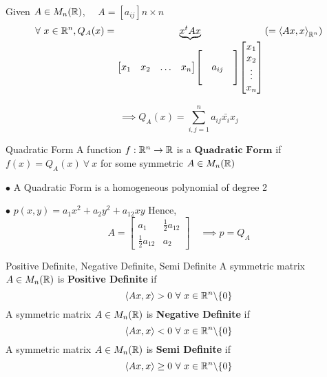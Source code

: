 \documentclass[../Analysis-3]{subfiles}
\begin{document}
\begin{notnBox}
    Given $A \in M_n(\mathbb{R})$, $ \quad A = \left[a_{ij}\right] n \times n $
    \[ \forall\ x \in \mathbb{R}^n, Q_A(x) = \underbrace{x^tAx}_{\begin{bmatrix}
                x_1 & x_2 & \ldots & x_n
            \end{bmatrix} \begin{bmatrix}
                 &        & \\
                 & a_{ij} & \\
                 &        &
            \end{bmatrix} \begin{bmatrix}
                x_1    \\
                x_2    \\
                \vdots \\
                x_n
            \end{bmatrix}} \left( = {\left\langle Ax, x \right\rangle}_{\mathbb{R}^n} \right) \]

    \[ \implies Q_A(x) = \sum_{i,j = 1}^{n} a_{ij} \bar{x_i} x_j  \]
\end{notnBox}


\begin{Def}{Quadratic Form}{}
    A function $f : \mathbb{R}^n \to \mathbb{R}$ is a $\textbf{Quadratic Form}$ if $f(x) = Q_A(x) \ \forall\ x $ for some symmetric $A \in M_n(\mathbb{R})$
\end{Def}

$\bullet$ A Quadratic Form is a homogeneous polynomial of degree 2

\vspace{3mm}

$\bullet$ $p(x,y) = a_1 x^2 + a_2 y^2 + a_{12} xy$
Hence, \[ A = \begin{bmatrix}
        a_1                & \frac{1}{2} a_{12} \\
        \frac{1}{2} a_{12} & a_2
    \end{bmatrix} \quad \implies p = Q_A \]

\begin{Def}{Positive Definite, Negative Definite, Semi Definite}{}
    A symmetric matrix $A \in M_n(\mathbb{R})$ is \textbf{Positive Definite} if \[ \left\langle Ax, x \right\rangle > 0 \ \forall\ x \in \R^n \backslash \{0\} \]
    \vspace{2mm}
    A symmetric matrix $A \in M_n(\mathbb{R})$ is \textbf{Negative Definite} if \[ \left\langle Ax, x \right\rangle < 0 \ \forall\ x \in \mathbb{R}^n \backslash \{0\} \]
    A symmetric matrix $A \in M_n(\mathbb{R})$ is \textbf{Semi Definite} if \[ \left\langle Ax, x \right\rangle \geq 0 \ \forall\ x \in \R^n \backslash \{0\} \]
\end{Def}
\end{document}

